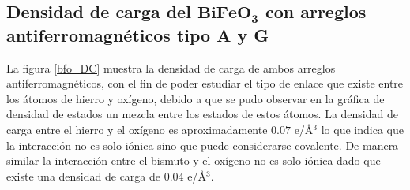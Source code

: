 \subsection{Densidad de carga del $\mathbf{BiFeO_{3}}$ con arreglos      
antiferromagn\'eticos tipo A y G}

La figura \ref{bfo_DC} muestra la densidad de carga de ambos arreglos 
antiferromagn\'eticos, con el fin de poder estudiar el tipo de enlace que 
existe entre los \'atomos de hierro y ox\'igeno, debido a que se pudo observar 
en la gr\'afica de densidad de estados un mezcla entre los estados de estos 
\'atomos. La densidad de carga entre el hierro y el ox\'igeno es 
aproximadamente $0.07$ e/\AA$^{3}$ lo que indica que la interacci\'on no es 
solo i\'onica sino que puede considerarse covalente. De manera similar la 
interacci\'on entre el bismuto y el ox\'igeno no es solo i\'onica dado que 
existe una densidad de carga de $0.04$ e/\AA$^{3}$. 



